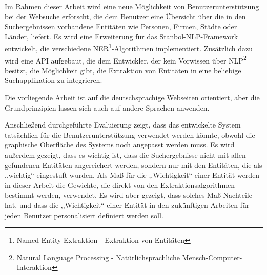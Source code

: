 Im Rahmen dieser Arbeit wird eine neue Möglichkeit von Benutzerunterstützung bei der Websuche erforscht, die dem Benutzer eine Übersicht über die in den Suchergebnissen vorhandene Entitäten wie Personen, Firmen, Städte oder Länder, liefert. Es wird eine Erweiterung für das Stanbol-NLP-Framework entwickelt, die verschiedene NER\footnote{Named Entity Extraktion - Extraktion von Entitäten}-Algorithmen implementiert. Zusätzlich dazu wird eine API aufgebaut, die dem Entwickler, der kein Vorwissen über NLP\footnote{Natural Language Processing - Natürlichsprachliche Mensch-Computer-Interaktion} besitzt, die Möglichkeit gibt, die Extraktion von Entitäten in eine beliebige Suchapplikation zu integrieren. 

Die vorliegende Arbeit ist auf die deutschsprachige Webseiten orientiert, aber die Grundprinzipien lassen sich auch auf andere Sprachen anwenden.

Anschließend durchgeführte Evaluierung zeigt, dass das entwickelte System tatsächlich für die Benutzerunterstützung verwendet werden könnte, obwohl die graphische Oberfläche des Systems noch angepasst werden muss. Es wird außerdem gezeigt, dass es wichtig ist, dass die Suchergebnisse nicht mit allen gefundenen Entitäten angereichert werden, sondern nur mit den Entitäten, die als ,,wichtig`` eingestuft wurden. Als Maß für die ,,Wichtigkeit`` einer Entität werden in dieser Arbeit die Gewichte, die direkt von den Extraktionsalgorithmen bestimmt werden, verwendet. Es wird aber gezeigt, dass solches Maß Nachteile hat, und dass die ,,Wichtigkeit`` einer Entität in den zukünftigen Arbeiten für jeden Benutzer personalisiert definiert werden soll.